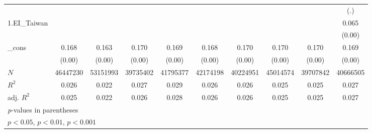 {\begin{tabular}{l*{9}{c}}
          &                  &                  &                  &                  &                  &                  &                  &                  &      (.)         \\
[1em]
1.EI\_Taiwan#1.t06&                  &                  &                  &                  &                  &                  &                  &                  &    0.065\sym{***}\\
          &                  &                  &                  &                  &                  &                  &                  &                  &   (0.00)         \\
[1em]
\_cons    &    0.168\sym{***}&    0.163\sym{***}&    0.170\sym{***}&    0.169\sym{***}&    0.168\sym{***}&    0.170\sym{***}&    0.170\sym{***}&    0.170\sym{***}&    0.169\sym{***}\\
          &   (0.00)         &   (0.00)         &   (0.00)         &   (0.00)         &   (0.00)         &   (0.00)         &   (0.00)         &   (0.00)         &   (0.00)         \\
\hline
\(N\)     & 46447230         & 53151993         & 39735402         & 41795377         & 42174198         & 40224951         & 45014574         & 39707842         & 40666505         \\
\(R^{2}\) &    0.026         &    0.022         &    0.027         &    0.029         &    0.026         &    0.026         &    0.025         &    0.025         &    0.027         \\
adj. \(R^{2}\)&    0.025         &    0.022         &    0.026         &    0.028         &    0.026         &    0.026         &    0.025         &    0.025         &    0.027         \\
\hline\hline
\multicolumn{10}{l}{\footnotesize \textit{p}-values in parentheses}\\
\multicolumn{10}{l}{\footnotesize \sym{*} \(p<0.05\), \sym{**} \(p<0.01\), \sym{***} \(p<0.001\)}\\
\end{tabular}
}
